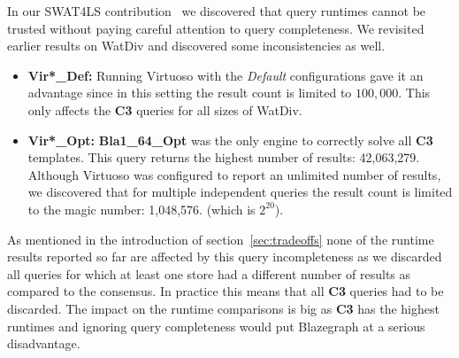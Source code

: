 
In our SWAT4LS contribution~\cite{dewitte_swat4ls_2016} we discovered that query runtimes cannot be trusted without paying careful attention to query completeness. We revisited earlier results on WatDiv and discovered some inconsistencies as well.
\begin{itemize}
	\item \textbf{Vir*\_Def:} Running Virtuoso with the \emph{Default} configurations gave it an advantage since in this setting the result count is limited to $100,000$. This only affects the \textbf{C3} queries for all sizes of WatDiv.
	\item \textbf{Vir*\_Opt:} \textbf{Bla1\_64\_Opt} was the only engine to correctly solve all \textbf{C3} templates. This query returns the highest number of results: 42,063,279. Although Virtuoso was configured to report an unlimited number of results, we discovered that for multiple independent queries the result count is limited to the magic number: 1,048,576. (which is $2^{20}$).  
\end{itemize}
As mentioned in the introduction of section~\ref{sec:tradeoffs} none of the runtime results reported so far are affected by this query incompleteness as we discarded all queries for which at least one store had a different number of results as compared to the consensus. In practice this means that all \textbf{C3} queries had to be discarded. The impact on the runtime comparisons is big as \textbf{C3} has the highest runtimes and ignoring query completeness would put Blazegraph at a serious disadvantage.

